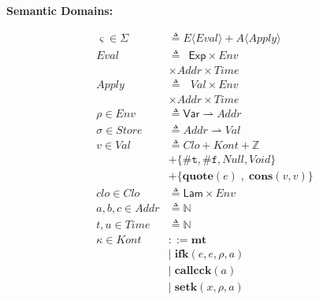 \documentclass[12pt,draft]{article}
\newcommand{\truesyn}{\texttt{\#t}}
\newcommand{\falsesyn}{\texttt{\#f}}
\begin{document}
\begin{multicols*}{2}
\vfill\null
\columnbreak


\begin{center}
\textbf{Semantic Domains:}
\end{center}
\vspace{-18mm}
\begin{center}
\begin{align*}
\varsigma \in \Sigma &\triangleq E\langle\textit{Eval}\rangle 
								+ A\langle\textit{Apply}\rangle \\
\textit{Eval} &\triangleq \:\;\textsf{Exp} \times \textit{Env} \\
						& \times \textit{Addr} \times \textit{Time} \\
\textit{Apply} &\triangleq \:\;\,\textit{Val} \times \textit{Env} \\
						& \times \textit{Addr} \times \textit{Time} \\
\rho \in \textit{Env} &\triangleq \textsf{Var} \rightharpoonup 
												\textit{Addr} \\
\sigma \in \textit{Store} &\triangleq \textit{Addr} \rightharpoonup
													\textit{Val} \\
v \in \textit{Val} &\triangleq \textit{Clo} + \textit{Kont} + \mathbb{Z} \\
				&+ \{ \truesyn,\falsesyn, \textit{Null} , \textit{Void} \} \\
				&+ \{\textbf{quote}(e) \;,\; \textbf{cons}(v, v)\} \\
clo \in \textit{Clo} &\triangleq \textsf{Lam} \times \textit{Env} \\
a,b,c \in \textit{Addr} &\triangleq \mathbb{N} \\
t,u \in \textit{Time} &\triangleq \mathbb{N} \\
\kappa \in \textit{Kont} &::= \textbf{mt} \\
        &|\; \textbf{ifk}(e, e, \rho, a) \\
        &|\; \textbf{callcck}(a) \\
        &|\; \textbf{setk}(x, \rho, a) \\

\end{align*}
\end{center}
\end{multicols*}
\end{document}
